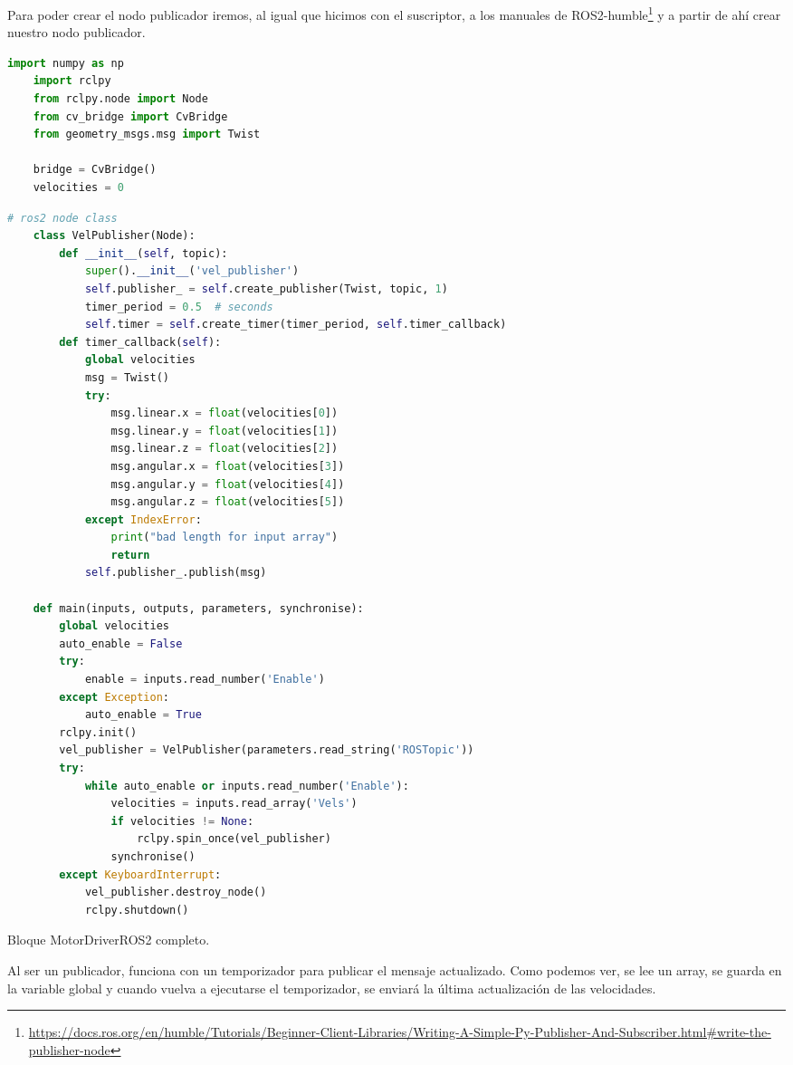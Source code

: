 Para poder crear el nodo publicador iremos, al igual que hicimos con el suscriptor, a los manuales de
ROS2-humble\footnote{\url{https://docs.ros.org/en/humble/Tutorials/Beginner-Client-Libraries/Writing-A-Simple-Py-Publisher-And-Subscriber.html\#write-the-publisher-node}} y
a partir de ahí crear nuestro nodo publicador.













\begin{code}[H]
  \begin{lstlisting}[language=python]
    import numpy as np
    import rclpy
    from rclpy.node import Node
    from cv_bridge import CvBridge
    from geometry_msgs.msg import Twist

    bridge = CvBridge()
    velocities = 0

  \end{lstlisting}
\end{code}
\begin{code}[H]
  \begin{lstlisting}[language=python]
    # ros2 node class
    class VelPublisher(Node):
        def __init__(self, topic):
            super().__init__('vel_publisher')
            self.publisher_ = self.create_publisher(Twist, topic, 1)
            timer_period = 0.5  # seconds
            self.timer = self.create_timer(timer_period, self.timer_callback)
        def timer_callback(self):
            global velocities
            msg = Twist()
            try:
                msg.linear.x = float(velocities[0])
                msg.linear.y = float(velocities[1])
                msg.linear.z = float(velocities[2])
                msg.angular.x = float(velocities[3])
                msg.angular.y = float(velocities[4])
                msg.angular.z = float(velocities[5])
            except IndexError:
                print("bad length for input array")
                return
            self.publisher_.publish(msg)

    def main(inputs, outputs, parameters, synchronise):
        global velocities
        auto_enable = False
        try:
            enable = inputs.read_number('Enable')
        except Exception:
            auto_enable = True
        rclpy.init()
        vel_publisher = VelPublisher(parameters.read_string('ROSTopic'))
        try:
            while auto_enable or inputs.read_number('Enable'):
                velocities = inputs.read_array('Vels')
                if velocities != None:
                    rclpy.spin_once(vel_publisher) 
                synchronise()   
        except KeyboardInterrupt:
            vel_publisher.destroy_node()
            rclpy.shutdown()
  \end{lstlisting}
  \caption[Bloque MotorDriverROS2]{Bloque MotorDriverROS2 completo.}
  \label{cod:motordriverros2_all}
\end{code}

Al ser un publicador, funciona con un temporizador para publicar el mensaje actualizado. Como podemos ver, se lee un array, se guarda en
la variable global y cuando vuelva a ejecutarse el temporizador, se enviará la última actualización de las velocidades.













